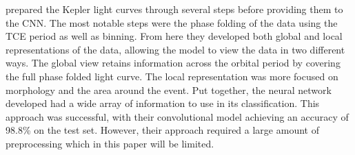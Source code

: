 \citet{2018AJ....155...94S} prepared the Kepler light curves through several steps before providing them to the CNN. The most notable steps were the phase folding of the data using the TCE period as well as binning. From here they developed both global and local representations of the data, allowing the model to view the data in two different ways. The global view retains information across the orbital period by covering the full phase folded light curve. The local representation was more focused on morphology and the area around the event. Put together, the neural network developed had a wide array of information to use in its classification. This approach was successful, with their convolutional model achieving an accuracy of 98.8\% on the test set. However, their approach required a large amount of preprocessing which in this paper will be limited.

